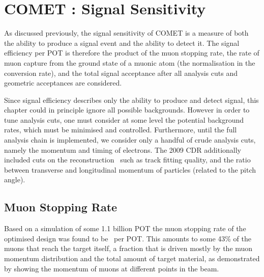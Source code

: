 
\chapter{COMET \phaseII: Signal Sensitivity}
As discussed previously, the signal sensitivity of COMET is a measure of both the ability to produce a signal event
and the ability to detect it.
The signal efficiency per \ac{POT} is therefore the product of the muon stopping rate, the rate of muon capture from the ground state of a muonic atom (the normalisation in the conversion rate), and the total signal acceptance after all analysis cuts and geometric acceptances are considered.

Since signal efficiency describes only the ability to produce and detect signal, this chapter could in principle ignore all possible backgrounds.
However in order to tune analysis cuts, one must consider at some level the potential background rates, which must be minimised and controlled.
Furthermore, until the full analysis chain is implemented, we consider only a handful of crude analysis cuts, namely the momentum and timing of electrons.
The 2009 \ac{CDR} additionally included cuts on the reconstruction~\cite{CDRphase2} such as track fitting quality, and the ratio between transverse and longitudinal momentum of particles (related to the pitch angle).

\FigSensMuMomentum
\section{Muon Stopping Rate}
Based on a simulation of some 1.1 billion \ac{POT} the muon stopping rate of the optimised design was found to be ~per \ac{POT}.
This amounts to some 43\% of the muons that reach the target itself, a fraction that is driven mostly by the muon momentum distribution and the total amount of target material, as demonstrated by 
showing the momentum of muons at different points in the beam.

